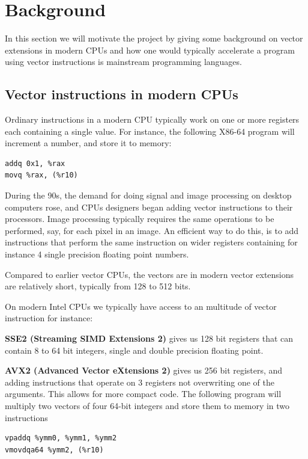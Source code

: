 \documentclass{article}
\begin{document}
\section{Background}

In this section we will motivate the project by giving some background on vector extensions in modern CPUs and how one would typically accelerate a program using vector instructions is mainstream programming languages.

\subsection{Vector instructions in modern CPUs}

Ordinary instructions in a modern CPU typically work on one or more registers each containing a single value. For instance, the following X86-64 program will increment a number, and store it to memory:
\begin{verbatim}
addq 0x1, %rax
movq %rax, (%r10)
\end{verbatim}

During the 90s, the demand for doing signal and image processing on desktop computers rose, and CPUs designers began adding vector instructions to their processors. Image processing typically requires the same operations to be performed, say, for each pixel in an image. An efficient way to do this, is to add instructions that perform the same instruction on wider registers containing for instance 4 single precision floating point numbers.

Compared to earlier vector CPUs, the vectors are in modern vector extensions are relatively short, typically from 128 to 512 bits.

On modern Intel CPUs we typically have access to an multitude of vector instruction for instance:

\textbf{SSE2 (Streaming SIMD Extensions 2)} gives us 128 bit registers that can contain 8 to 64 bit integers, single and double precision floating point.

\textbf{AVX2 (Advanced Vector eXtensions 2)}
gives us 256 bit registers, and adding instructions that operate on 3 registers not overwriting one of the arguments. This allows for more compact code. The following program will multiply two vectors of four 64-bit integers and store them to memory in two instructions
\begin{verbatim}
vpaddq %ymm0, %ymm1, %ymm2
vmovdqa64 %ymm2, (%r10)
\end{verbatim}
\end{document}
